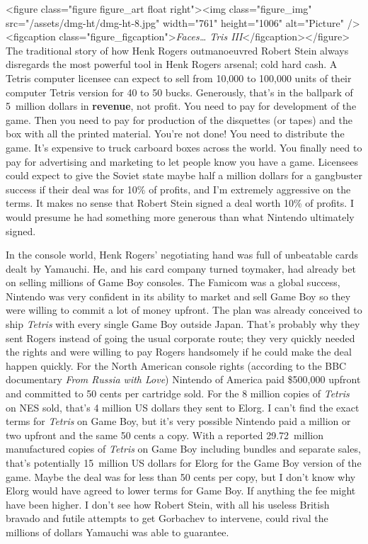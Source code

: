 \documentclass{book}
\begin{document}
<figure class="figure figure_art float right"><img class="figure_img" src="/assets/dmg-ht/dmg-ht-8.jpg" width="761" height="1006" alt="Picture" /><figcaption class="figure_figcaption">\emph{Faces… Tris III}</figcaption></figure>
The traditional story of how Henk Rogers outmanoeuvred Robert Stein always disregards the most powerful tool in Henk Rogers arsenal; cold hard cash. A Tetris computer licensee can expect to sell from 10,000 to 100,000 units of their computer Tetris version for 40 to 50 bucks. Generously, that’s in the ballpark of 5~million dollars in \textbf{revenue}, not profit. You need to pay for development of the game. Then you need to pay for production of the disquettes (or tapes) and the box with all the printed material. You’re not done! You need to distribute the game. It’s expensive to truck carboard boxes across the world. You finally need to pay for advertising and marketing to let people know you have a game. Licensees could expect to give the Soviet state maybe half a million dollars for a gangbuster success if their deal was for 10\% of profits, and I’m extremely aggressive on the terms. It makes no sense that Robert Stein signed a deal worth 10\% of profits. I would presume he had something more generous than what Nintendo ultimately signed.

In the console world, Henk Rogers’ negotiating hand was full of unbeatable cards dealt by Yamauchi. He, and his card company turned toymaker, had already bet on selling millions of Game Boy consoles. The Famicom was a global success, Nintendo was very confident in its ability to market and sell Game Boy so they were willing to commit a lot of money upfront. The plan was already conceived to ship \emph{Tetris} with every single Game Boy outside Japan. That’s probably why they sent Rogers instead of going the usual corporate route; they very quickly needed the rights and were willing to pay Rogers handsomely if he could make the deal happen quickly. For the North American console rights (according to the BBC documentary \emph{From Russia with Love}) Nintendo of America paid \$500,000 upfront and committed to 50 cents per cartridge sold. For the 8 million copies of \emph{Tetris} on NES sold, that’s 4 million US dollars they sent to Elorg. I can’t find the exact terms for \emph{Tetris} on Game Boy, but it’s very possible Nintendo paid a million or two upfront and the same 50 cents a copy. With a reported 29.72~million manufactured copies of \emph{Tetris} on Game Boy including bundles and separate sales, that’s potentially 15~million US dollars for Elorg for the Game Boy version of the game. Maybe the deal was for less than 50 cents per copy, but I don’t know why Elorg would have agreed to lower terms for Game Boy. If anything the fee might have been higher. I don’t see how Robert Stein, with all his useless British bravado and futile attempts to get Gorbachev to intervene, could rival the millions of dollars Yamauchi was able to guarantee.
\end{document}
